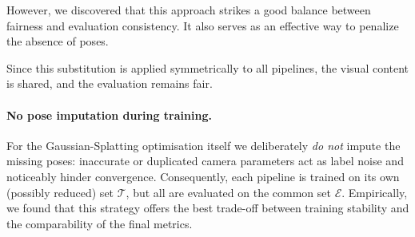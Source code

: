 However, we discovered that this approach strikes a good balance between fairness and evaluation consistency. 
It also serves as an effective way to penalize the absence of poses.

Since this substitution is applied symmetrically to all pipelines, the visual content is shared, and the evaluation remains fair.

\paragraph{No pose imputation during training.}
For the Gaussian-Splatting optimisation itself we deliberately \emph{do not} impute the missing poses: inaccurate or duplicated camera parameters act as label noise and noticeably hinder convergence. 
Consequently, each pipeline is trained on its own (possibly reduced) set $\mathcal{T}$, but all are evaluated on the common set $\mathcal{E}$. 
Empirically, we found that this strategy offers the best trade-off between training stability and the comparability of the final metrics.






